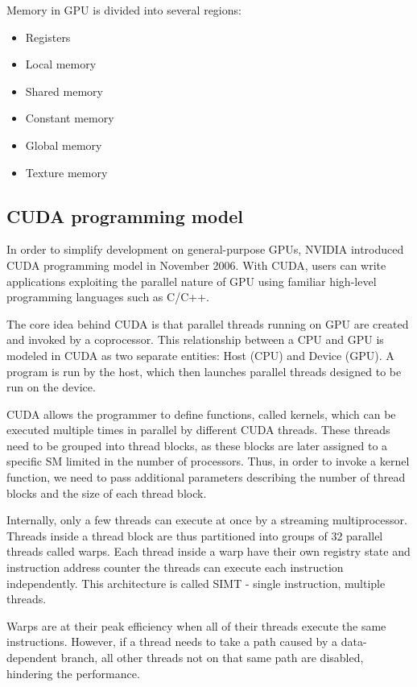 \documentclass[thesis=B,english]{FITthesis}[2019/12/23]
\begin{document}
Memory in GPU is divided into several regions:

\begin{itemize}
	\item Registers
	\item Local memory
	\item Shared memory
	\item Constant memory
	\item Global memory
	\item Texture memory
\end{itemize}

\subsection{CUDA programming model}
In order to simplify development on general-purpose GPUs, NVIDIA introduced CUDA programming model in November 2006. With CUDA, users can write applications exploiting the parallel nature of GPU using familiar high-level programming languages such as C/C++.

The core idea behind CUDA is that parallel threads running on GPU are created and invoked by a coprocessor. This relationship between a CPU and GPU is modeled in CUDA as two separate entities: Host (CPU) and Device (GPU). A program is run by the host, which then launches parallel threads designed to be run on the device.

CUDA allows the programmer to define functions, called kernels, which can be executed multiple times in parallel by different CUDA threads. These threads need to be grouped into thread blocks, as these blocks are later assigned to a specific SM limited in the number of processors. Thus, in order to invoke a kernel function, we need to pass additional parameters describing the number of thread blocks and the size of each thread block.

Internally, only a few threads can execute at once by a streaming multiprocessor. Threads inside a thread block are thus partitioned into groups of 32 parallel threads called warps. Each thread inside a warp have their own registry state and instruction address counter the threads can execute each instruction independently. This architecture is called SIMT - single instruction, multiple threads.

Warps are at their peak efficiency when all of their threads execute the same instructions. However, if a thread needs to take a path caused by a data-dependent branch, all other threads not on that same path are disabled, hindering the performance.
\end{document}
